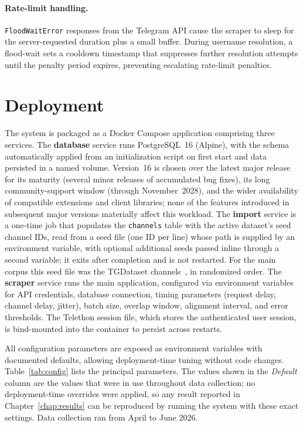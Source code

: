 \paragraph{Rate-limit handling.}
\texttt{FloodWaitError} responses from the Telegram API cause the scraper to sleep for the server-requested duration plus a small buffer.
During username resolution, a flood-wait sets a cooldown timestamp that suppresses further resolution attempts until the penalty period expires, preventing escalating rate-limit penalties.

\section{Deployment}
\label{sec:deployment}

The system is packaged as a Docker Compose application comprising three services.
The \textbf{database} service runs PostgreSQL~16 (Alpine), with the schema automatically applied from an initialization script on first start and data persisted in a named volume.
Version~16 is chosen over the latest major release for its maturity (several minor releases of accumulated bug fixes), its long community-support window (through November~2028), and the wider availability of compatible extensions and client libraries; none of the features introduced in subsequent major versions materially affect this workload.
The \textbf{import} service is a one-time job that populates the \texttt{channels} table with the active dataset's seed channel IDs, read from a seed file (one ID per line) whose path is supplied by an environment variable, with optional additional seeds passed inline through a second variable; it exits after completion and is not restarted. For the main corpus this seed file was the TGDataset channels~\cite{lamorgia2025}, in randomized order.
The \textbf{scraper} service runs the main application, configured via environment variables for API credentials, database connection, timing parameters (request delay, channel delay, jitter), batch size, overlap window, alignment interval, and error thresholds.
The Telethon session file, which stores the authenticated user session, is bind-mounted into the container to persist across restarts.

All configuration parameters are exposed as environment variables with documented defaults, allowing deployment-time tuning without code changes.
Table~\ref{tab:config} lists the principal parameters. The values shown in the \textit{Default} column are the values that were in use throughout data collection; no deployment-time overrides were applied, so any result reported in Chapter~\ref{chap:results} can be reproduced by running the system with these exact settings. Data collection ran from April to June 2026.

